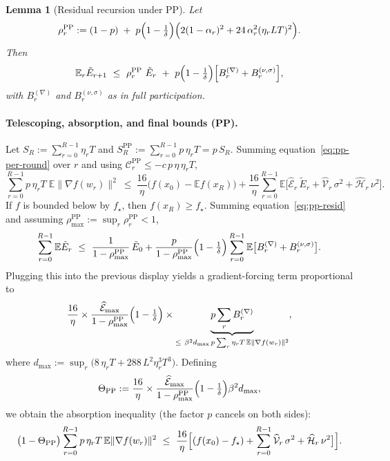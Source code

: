 \documentclass{article} %
\def\eqref#1{equation~\ref{#1}}
\newcommand{\E}{\mathbb{E}}
\newtheorem{lemma}{Lemma}
\begin{document}
\begin{lemma}[Residual recursion under PP]\label{lem:pp-resid}
Let
\[
\rho_r^{\mathrm{PP}}:=(1-p)\;+\;p\Bigl(1-\tfrac1\delta\Bigr)\Bigl(2(1-\alpha_r)^2+24\,\alpha_r^2(\eta_rLT)^2\Bigr).
\]
Then
\begin{equation}\label{eq:pp-resid}
\E_r \tilde E_{r+1}
\ \le\ \rho_r^{\mathrm{PP}}\ \tilde E_r
\ +\ p\Bigl(1-\tfrac1\delta\Bigr)\Bigl[B_r^{(\nabla)}+B_r^{(\nu,\sigma)}\Bigr],
\end{equation}
with $B_r^{(\nabla)}$ and $B_r^{(\nu,\sigma)}$ as in full participation.
\end{lemma}

\paragraph{Telescoping, absorption, and final bounds (PP).}
Let $S_R:=\sum_{r=0}^{R-1}\eta_rT$ and $S_R^{\mathrm{PP}}:=\sum_{r=0}^{R-1}p\,\eta_rT=p\,S_R$.
Summing \eqref{eq:pp-per-round} over $r$ and using $\mathcal C_r^{\mathrm{PP}}\le -c\,p\,\eta\,\eta_rT$,
\[
\sum_{r=0}^{R-1}p\,\eta_rT\;\E\|\nabla f(w_r)\|^{2}
\ \le\ \frac{16}{\eta}\bigl(f(x_0)-\E f(x_R)\bigr)
+\frac{16}{\eta}\sum_{r=0}^{R-1}\E\bigl[\widehat{\mathcal E}_r\,\tilde E_r
+\widehat{\mathcal V}_r\,\sigma^{2}+\widehat{\mathcal H}_r\,\nu^{2}\bigr].
\]
If $f$ is bounded below by $f_\star$, then $f(x_R)\ge f_\star$. Summing \eqref{eq:pp-resid} and
assuming $\rho_{\max}^{\mathrm{PP}}:=\sup_r\rho_r^{\mathrm{PP}}<1$,
\[
\sum_{r=0}^{R-1}\E\tilde E_r
\ \le\ \frac{1}{1-\rho_{\max}^{\mathrm{PP}}}\,\tilde E_0
+\frac{p}{1-\rho_{\max}^{\mathrm{PP}}}\Bigl(1-\tfrac1\delta\Bigr)
\sum_{r=0}^{R-1}\E\bigl[B_r^{(\nabla)}+B_r^{(\nu,\sigma)}\bigr].
\]
Plugging this into the previous display yields a gradient-forcing term proportional to
\[
\frac{16}{\eta}\times\frac{\widehat{\mathcal E}_{\max}}{1-\rho_{\max}^{\mathrm{PP}}}\Bigl(1-\tfrac1\delta\Bigr)\times
\underbrace{p\sum_r B_r^{(\nabla)}}_{\le\ \beta^2 d_{\max}\,p\sum_r\eta_rT\,\E\|\nabla f(w_r)\|^2},
\]
where $d_{\max}:=\sup_r\bigl(8\,\eta_rT+288\,L^{2}\eta_r^{3}T^{3}\bigr)$. Defining
\[
\Theta_{\mathrm{PP}}
:= \frac{16}{\eta}\times\frac{\widehat{\mathcal E}_{\max}}{1-\rho_{\max}^{\mathrm{PP}}}\Bigl(1-\tfrac1\delta\Bigr)\beta^{2} d_{\max},
\]
we obtain the absorption inequality (the factor $p$ cancels on both sides):
\[
\bigl(1-\Theta_{\mathrm{PP}}\bigr)\sum_{r=0}^{R-1}p\,\eta_rT\,\E\|\nabla f(w_r)\|^{2}
\ \le\ \frac{16}{\eta}\Bigl[(f(x_0)-f_\star)+\sum_{r=0}^{R-1}\widehat{\mathcal V}_r\,\sigma^{2}+\widehat{\mathcal H}_r\,\nu^{2}\bigr]\Bigr].
\]
\end{document}
